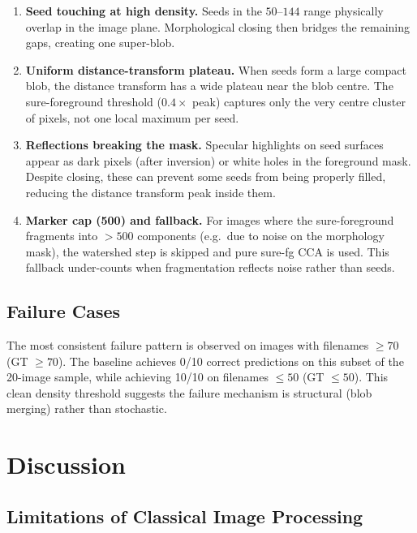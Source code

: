 \documentclass[12pt,a4paper]{article}
\begin{document}
\begin{enumerate}
    \item \textbf{Seed touching at high density.} Seeds in the $50$--$144$
          range physically overlap in the image plane. Morphological closing
          then bridges the remaining gaps, creating one super-blob.
    \item \textbf{Uniform distance-transform plateau.} When seeds form a
          large compact blob, the distance transform has a wide plateau near
          the blob centre. The sure-foreground threshold ($0.4 \times$
          peak) captures only the very centre cluster of pixels, not one
          local maximum per seed.
    \item \textbf{Reflections breaking the mask.} Specular highlights on
          seed surfaces appear as dark pixels (after inversion) or white
          holes in the foreground mask. Despite closing, these can prevent
          some seeds from being properly filled, reducing the distance
          transform peak inside them.
    \item \textbf{Marker cap (500) and fallback.} For images where the
          sure-foreground fragments into $>500$ components (e.g.\ due to
          noise on the morphology mask), the watershed step is skipped and
          pure sure-fg CCA is used. This fallback under-counts when
          fragmentation reflects noise rather than seeds.
\end{enumerate}

\subsection{Failure Cases}

The most consistent failure pattern is observed on images with filenames
$\geq 70$ (GT $\geq 70$). The baseline achieves 0/10 correct predictions on
this subset of the 20-image sample, while achieving 10/10 on filenames $\leq
50$ (GT $\leq 50$). This clean density threshold suggests the failure
mechanism is structural (blob merging) rather than stochastic.

\newpage

\section{Discussion}

\subsection{Limitations of Classical Image Processing}
\end{document}
